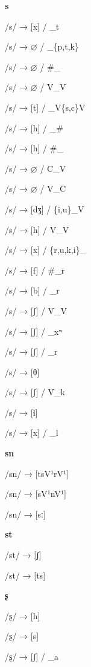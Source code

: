 \begin{center}\textbf{s}\end{center}
\begin{multicols}{4}
\noindent /s/ → [x] / \_t

\noindent /s/ → $\varnothing$ / \_\{p,t,k\}

\noindent /s/ → $\varnothing$ / \#\_

\noindent /s/ → $\varnothing$ / V\_V

\noindent /s/ → [t] / \_V\{s,c\}V

\noindent /s/ → [h] / \_\#

\noindent /s/ → [h] / \#\_

\noindent /s/ → $\varnothing$ / C\_V

\noindent /s/ → $\varnothing$ / V\_C

\noindent /s/ → [dʒ] / \{i,u\}\_V

\noindent /s/ → [h] / V\_V

\noindent /s/ → [x] / \{r,u,k,i\}\_

\noindent /s/ → [f] / \#\_r

\noindent /s/ → [b] / \_r

\noindent /s/ → [ʃ] / V\_V

\noindent /s/ → [ʃ] / \_xʷ

\noindent /s/ → [ʃ] / \_r

\noindent /s/ → [θ]

\noindent /s/ → [ʃ] / V\_k

\noindent /s/ → [ɬ]

\noindent /s/ → [x] / \_l
\end{multicols}


\begin{center}\textbf{sn}\end{center}
\begin{multicols}{4}
\noindent /sn/ → [tsV¹rV¹]

\noindent /sn/ → [sV¹nV¹]

\noindent /sn/ → [sː]
\end{multicols}

\begin{center}\textbf{st}\end{center}
\begin{multicols}{4}
\noindent /st/ → [ʃ]

\noindent /st/ → [ts]
\end{multicols}


\begin{center}\textbf{ʂ}\end{center}
\begin{multicols}{4}
\noindent /ʂ/ → [h]

\noindent /ʂ/ → [s]

\noindent /ʂ/ → [ʃ] / \_a
\end{multicols}


